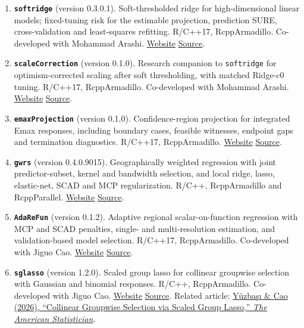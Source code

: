 \documentclass[10pt,letterpaper]{article}
\newenvironment{etaremune}{\begin{enumerate}}{\end{enumerate}}
\begin{document}
\begin{etaremune}
\renewcommand{\theenumi}{A\arabic{enumi}}

\item \textbf{\texttt{softridge}} (version 0.3.0.1). Soft-thresholded ridge for high-dimensional linear models; fixed-tuning risk for the estimable projection, prediction SURE, cross-validation and least-squares refitting. R/C++17, RcppArmadillo. Co-developed with Mohammad Arashi. \href{https://byuzbasi.github.io/softridge/}{Website} \textbar{} \href{https://github.com/byuzbasi/softridge}{Source}.

\item \textbf{\texttt{scaleCorrection}} (version 0.1.0). Research companion to \texttt{softridge} for optimism-corrected scaling after soft thresholding, with matched Ridge-c0 tuning. R/C++17, RcppArmadillo. Co-developed with Mohammad Arashi. \href{https://byuzbasi.github.io/softridge/scaleCorrection/}{Website} \textbar{} \href{https://github.com/byuzbasi/softridge/tree/main/companion/scaleCorrection}{Source}.

\item \textbf{\texttt{emaxProjection}} (version 0.1.0). Confidence-region projection for integrated Emax responses, including boundary cases, feasible witnesses, endpoint gaps and termination diagnostics. R/C++17, RcppArmadillo. \href{https://byuzbasi.github.io/emaxProjection/}{Website} \textbar{} \href{https://github.com/byuzbasi/emaxProjection}{Source}.

\item \textbf{\texttt{gwrs}} (version 0.4.0.9015). Geographically weighted regression with joint predictor-subset, kernel and bandwidth selection, and local ridge, lasso, elastic-net, SCAD and MCP regularization. R/C++, RcppArmadillo and RcppParallel. \href{https://byuzbasi.github.io/gwrs/}{Website} \textbar{} \href{https://github.com/byuzbasi/gwrs}{Source}.

\item \textbf{\texttt{AdaReFun}} (version 0.1.2). Adaptive regional scalar-on-function regression with MCP and SCAD penalties, single- and multi-resolution estimation, and validation-based model selection. R/C++17, RcppArmadillo. Co-developed with Jiguo Cao. \href{https://byuzbasi.github.io/AdaReFun/}{Website} \textbar{} \href{https://github.com/byuzbasi/AdaReFun}{Source}.

\item \textbf{\texttt{sglasso}} (version 1.2.0). Scaled group lasso for collinear groupwise selection with Gaussian and binomial responses. R/C++, RcppArmadillo. Co-developed with Jiguo Cao. \href{https://byuzbasi.github.io/sglasso/}{Website} \textbar{} \href{https://github.com/byuzbasi/sglasso}{Source}. Related article: \href{https://doi.org/10.1080/00031305.2026.2709494}{Y\"{u}zba\c{s}{\i} \& Cao (2026), ``Collinear Groupwise Selection via Scaled Group Lasso,'' \textit{The American Statistician}}.


\end{etaremune}
\end{document}
